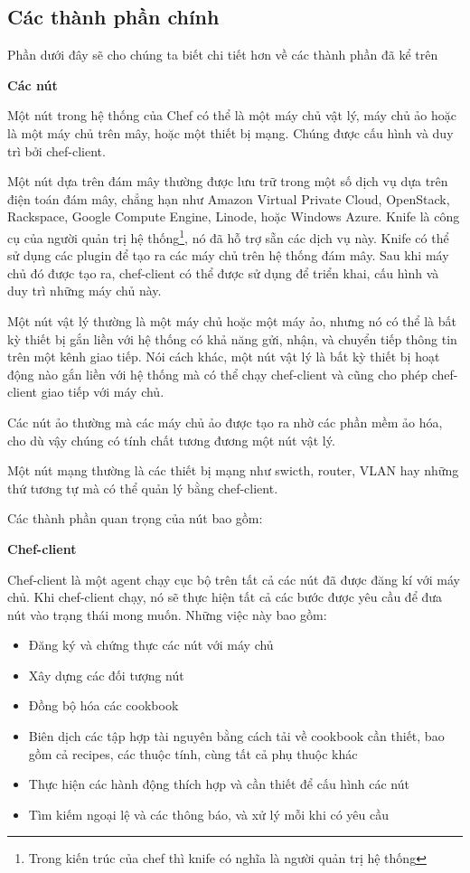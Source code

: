 \subsection{Các thành phần chính}
Phần dưới đây sẽ cho chúng ta biết chi tiết hơn về các thành phần đã kể trên

\textbf{\large Các nút}


Một nút trong hệ thống của Chef có thể là một máy chủ vật lý, máy chủ ảo hoặc là một máy chủ trên mây, hoặc một thiết bị mạng. Chúng được cấu hình và duy trì bởi chef-client.

Một nút dựa trên đám mây thường được lưu trữ trong một số dịch vụ dựa trên điện toán đám mây, chẳng hạn như Amazon Virtual Private Cloud, OpenStack, Rackspace, Google Compute Engine, Linode, hoặc Windows Azure. Knife là công cụ của người quản trị hệ thống\footnote{Trong kiến trúc của chef thì knife có nghĩa là người quản trị hệ thống}, nó đã hỗ trợ sẵn các dịch vụ này. Knife có thể sử dụng các plugin để tạo ra các máy chủ trên hệ thống đám mây. Sau khi máy chủ đó được tạo ra, chef-client có thể được sử dụng để triển khai, cấu hình và duy trì những máy chủ này.

Một nút vật lý thường là một máy chủ hoặc một máy ảo, nhưng nó có thể là bất kỳ thiết bị gắn liền với hệ thống có khả năng gửi, nhận, và chuyển tiếp thông tin trên một kênh giao tiếp. Nói cách khác, một nút vật lý là bất kỳ thiết bị hoạt động nào gắn liền với hệ thống mà có thể chạy chef-client và cũng cho phép chef-client giao tiếp với máy chủ.

Các nút ảo thường mà các máy chủ ảo được tạo ra nhờ các phần mềm ảo hóa, cho dù vậy chúng có tính chất tương đương một nút vật lý.

Một nút mạng thường là các thiết bị mạng như swicth, router, VLAN hay những thứ tương tự mà có thể quản lý bằng chef-client.

Các thành phần quan trọng của nút bao gồm:

\textbf{Chef-client}

Chef-client là một agent chạy cục bộ trên tất cả các nút đã được đăng kí với máy chủ. Khi chef-client chạy, nó sẽ thực hiện tất cả các bước được yêu cầu để đưa nút vào trạng thái mong muốn. Những việc này bao gồm:

\begin{itemize}
\item Đăng ký và chứng thực các nút với máy chủ
\item Xây dựng các đối tượng nút
\item Đồng bộ hóa các cookbook
\item Biên dịch các tập hợp tài nguyên bằng cách tải về cookbook cần thiết, bao gồm cả recipes, các thuộc tính, cùng tất cả phụ thuộc khác
\item Thực hiện các hành động thích hợp và cần thiết để cấu hình các nút
\item Tìm kiếm ngoại lệ và các thông báo, và xử lý mỗi khi có yêu cầu
\end{itemize}


